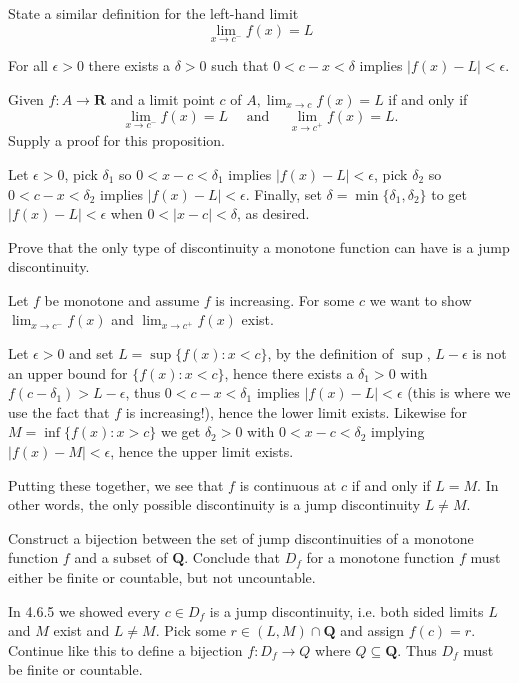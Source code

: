 \begin{exercise}
  State a similar definition for the left-hand limit
  $$
  \lim _{x \rightarrow c^{-}} f(x)=L
  $$
\end{exercise}
\begin{solution}
  For all $\epsilon > 0$ there exists a $\delta > 0$ such that $0 < c-x < \delta$ implies $|f(x)-L|<\epsilon$.
\end{solution}

\begin{exercise}
  Given $f: A \rightarrow \mathbf{R}$ and a limit point $c$ of $A, \lim _{x \rightarrow c} f(x)=L$ if and only if
  $$
  \lim _{x \rightarrow c^{-}} f(x)=L \quad \text { and } \quad \lim _{x \rightarrow c^{+}} f(x)=L .
  $$
  Supply a proof for this proposition.
\end{exercise}
\begin{solution}
  Let $\epsilon > 0$, pick $\delta_1$ so $0 < x-c < \delta_1$ implies $|f(x)-L|<\epsilon$, pick $\delta_2$ so $0 < c-x < \delta_2$ implies $|f(x)-L|<\epsilon$. Finally, set $\delta = \min\{\delta_1, \delta_2\}$ to get $|f(x)-L|<\epsilon$ when $0 < |x-c| < \delta$, as desired.
\end{solution}

\begin{exercise}
  Prove that the only type of discontinuity a monotone function can have is a jump discontinuity.
\end{exercise}
\begin{solution}
  Let $f$ be monotone and assume $f$ is increasing. For some $c$ we want to show $\lim_{x \to c^{-}} f(x)$ and $\lim_{x \to c^{+}} f(x)$ exist.

  Let $\epsilon > 0$ and set $L = \sup\{f(x) : x < c\}$, by the definition of $\sup$, $L-\epsilon$ is not an upper bound for $\{f(x) : x < c\}$, hence there exists a $\delta_1 > 0$ with $f(c-\delta_1) > L-\epsilon$, thus $0 < c-x < \delta_1$ implies $|f(x)-L| < \epsilon$ (this is where we use the fact that $f$ is increasing!), hence the lower limit exists. Likewise for $M = \inf\{f(x) : x > c\}$ we get $\delta_2 > 0$ with $0 < x-c < \delta_2$ implying $|f(x)-M|<\epsilon$, hence the upper limit exists.

  Putting these together, we see that $f$ is continuous at $c$ if and only if $L = M$. In other words, the only possible discontinuity is a jump discontinuity $L \ne M$.
\end{solution}

\begin{exercise}
  Construct a bijection between the set of jump discontinuities of a monotone function $f$ and a subset of $\mathbf{Q}$. Conclude that $D_{f}$ for a monotone function $f$ must either be finite or countable, but not uncountable.
\end{exercise}
\begin{solution}
  In 4.6.5 we showed every $c \in D_f$ is a jump discontinuity, i.e. both sided limits $L$ and $M$ exist and $L \ne M$. Pick some $r \in (L,M) \cap \mathbf{Q}$ and assign $f(c) = r$. Continue like this to define a bijection $f : D_f \to Q$ where $Q \subseteq \mathbf{Q}$. Thus $D_f$ must be finite or countable.
\end{solution}

